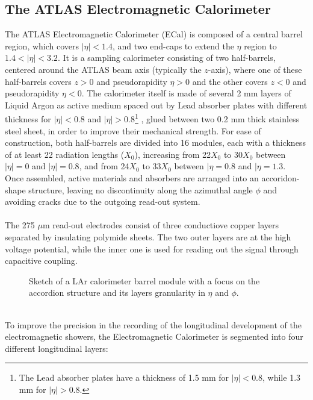 \subsection{The ATLAS Electromagnetic Calorimeter}
The ATLAS Electromagnetic Calorimeter (ECal)\cite{CERN-LHCC-96-041, Aad2010ai} is composed of a central barrel region, which covers $|\eta| < 1.4$, and two end-caps to extend the $\eta$ region to $1.4 < |\eta| < 3.2$. It is a sampling calorimeter consisting of two half-barrels, centered around the ATLAS beam axis (typically the $z$-axis), where one of these half-barrels covers $z > 0$ and pseudorapidity $\eta > 0$ and the other covers $z < 0$ and pseudorapidity $\eta < 0$. The calorimeter itself is made of several 2 mm layers of Liquid Argon as active medium spaced out by Lead absorber plates with different thickness for $|\eta| < 0.8$ and $|\eta| > 0.8$\footnote{The Lead absorber plates have a thickness of 1.5 mm for $|\eta| < 0.8$, while 1.3 mm for $|\eta| > 0.8$.}
, glued between two 0.2 mm thick stainless steel sheet, in order to improve their mechanical strength. For ease of construction, both half-barrels are divided into 16 modules, each with a thickness of at least 22 radiation lengths ($X_0$), increasing from 22$X_0$ to 30$X_0$ between $|\eta| = 0$ and $|\eta| = 0.8$, and from 24$X_0$ to $33X_0$ between $|\eta = 0.8$ and $|\eta = 1.3$.
\\
Once assembled, active materials and absorbers are arranged into an accoridon-shape structure, leaving no discontinuity along the azimuthal angle $\phi$ and avoiding cracks due to the outgoing read-out system.
\\\\
The 275 $\mu$m read-out electrodes consist of three conductiove copper layers separated by insulating polymide sheets. The two outer layers are at the high voltage potential, while the inner one is used for reading out the signal through capacitive coupling.
\begin{figure}[h]
\centering
{}
\caption{Sketch of a LAr calorimeter barrel module with a focus on the accordion structure and its layers granularity in $\eta$ and $\phi$.}
\end{figure}
\phantom{i}
\\To improve the precision in the recording of the longitudinal development of the electromagnetic showers, the Electromagnetic Calorimeter is segmented into four different longitudinal layers:
